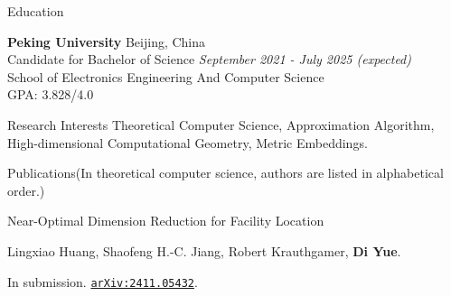 \documentclass{resume} %
\begin{document}

\begin{rSection}{Education}

{\bf Peking University} \hfill {Beijing, China} 
\\ Candidate for Bachelor of Science \hfill {\em September 2021 - July 2025 (expected)}
\\ School of Electronics Engineering And Computer Science
\\ GPA: 3.828/4.0



\end{rSection}

\begin{rSection}{Research Interests}{}
Theoretical Computer Science, Approximation Algorithm, High-dimensional Computational Geometry, Metric Embeddings.
\end{rSection}

\begin{rSection}{Publications}{(In theoretical computer science, authors are listed in alphabetical order.)}

    \begin{pubSubsection}{Near-Optimal Dimension Reduction for Facility Location}
        \item Lingxiao Huang, Shaofeng H.-C. Jiang, Robert Krauthgamer, \textbf{Di Yue}.
        \item In submission. 
        \href{https://arxiv.org/abs/2411.05432}{\texttt{arXiv:2411.05432}}.
    \end{pubSubsection}
\end{rSection}
\end{document}
